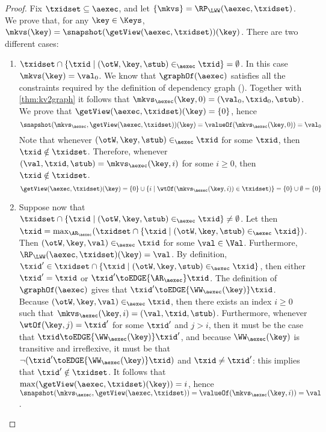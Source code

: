 \begin{proof}
Fix $\txidset \subseteq \aexec$, and let $\{\mkvs\} = \RP_{\LWW}(\aexec, \txidset)$. We prove that, for any $\key \in \Keys$, 
$\mkvs(\key) = \snapshot(\getView(\aexec, \txidset))(\key)$. There are two different cases: 
\begin{enumerate}
\item $\txidset \cap \{ \txid \mid (\otW, \key, \stub) \in_{\aexec} \txid \} = \emptyset$. 
In this case $\mkvs(\key) = \val_0$. 
We know that $\graphOf(\aexec)$ satisfies all the constraints required by the definition of dependency graph 
(\cite{laws}). Together with \cref{thm:kv2graph} it follows that $\mkvs_{\aexec}(\key, 0) = (\val_0, \txid_0, \stub)$.
We prove that $\getView(\aexec, \txidset)(\key) = \{0\}$, 
hence 
\[ 
\snapshot(\mkvs_{\aexec}, \getView(\aexec, \txidset))(\key) = \valueOf(\mkvs_{\aexec}(\key, 0)) = \val_{0}
\]
Note that whenever $(\otW, \key, \stub) \in_{\aexec} \txid$ for some $\txid$, then 
$\txid \notin \txidset$. Therefore, whenever $(\val, \txid, \stub) = \mkvs_{\aexec}(\key, i)$ for some $i \geq 0$, then 
$\txid \notin \txidset$.
\[
\getView(\aexec, \txidset)(\key) = \{0\} \cup \{i \mid \wtOf(\mkvs_{\aexec}(\key, i)) \in \txidset)\} = \{0\} \cup \emptyset = \{0\}
\]
\item Suppose now that $\txidset \cap \{ \txid \mid (\otW, \key, \stub) \in_{\aexec} \txid \} \neq \emptyset$. 
Let then $\txid = \max_{\AR_{\aexec}}(\txidset \cap \{\txid \mid (\otW, \key, \stub) \in_{\aexec} \txid\})$. 
Then $(\otW, \key, \val) \in_{\aexec} \txid$ for some $\val \in \Val$. Furthermore, $\RP_{\LWW}(\aexec, \txidset)(\key) = \val$.
By definition, $\txid' \in \txidset \cap \{ \txid \mid (\otW, \key, \stub) \in_{\aexec} \txid\}$, 
then either $\txid' = \txid$ or $\txid' \toEDGE{\AR_{\aexec}} \txid$. The definition of 
$\graphOf(\aexec)$ gives that $\txid' \toEDGE{\WW_{\aexec}(\key)} \txid$. 
Because $(\otW, \key, \val) \in_{\aexec} \txid$, then there exists an index 
$i \geq 0$ such that $\mkvs_{\aexec}(\key, i) = (\val, \txid, \stub)$. Furthermore, 
whenever $\wtOf(\key, j) = \txid'$ for some $\txid'$ and $j > i$, then it must 
be the case that $\txid \toEDGE{\WW_{\aexec}(\key)} \txid'$, and because 
$\WW_{\aexec}(\key)$ is transitive and irreflexive, it must be that  
$\neg( \txid' \toEDGE{\WW_{\aexec}(\key)} \txid)$ and $\txid \neq \txid'$: this implies that 
$\txid' \notin \txidset$. It follows that $\max(\getView(\aexec, \txidset)(\key)) = i$, hence 
$\snapshot(\mkvs_{\aexec}, \getView(\aexec, \txidset)) = \valueOf(\mkvs_{\aexec}(\key, i)) = \val$.
\end{enumerate}
\end{proof}

